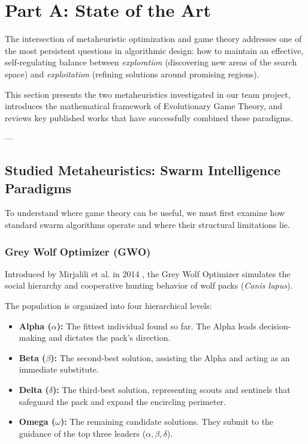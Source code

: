 \section{Part A: State of the Art}

The intersection of metaheuristic optimization and game theory addresses one of the most persistent questions in algorithmic design: how to maintain an effective, self-regulating balance between \textit{exploration} (discovering new areas of the search space) and \textit{exploitation} (refining solutions around promising regions). 

This section presents the two metaheuristics investigated in our team project, introduces the mathematical framework of Evolutionary Game Theory, and reviews key published works that have successfully combined these paradigms.

---

\subsection{Studied Metaheuristics: Swarm Intelligence Paradigms}

To understand where game theory can be useful, we must first examine how standard swarm algorithms operate and where their structural limitations lie.

\subsubsection{Grey Wolf Optimizer (GWO)}
Introduced by Mirjalili et al. in 2014 \cite{mirjalili2014grey}, the Grey Wolf Optimizer simulates the social hierarchy and cooperative hunting behavior of wolf packs (\textit{Canis lupus}).

The population is organized into four hierarchical levels:
\begin{itemize}
    \item \textbf{Alpha ($\alpha$):} The fittest individual found so far. The Alpha leads decision-making and dictates the pack's direction.
    \item \textbf{Beta ($\beta$):} The second-best solution, assisting the Alpha and acting as an immediate substitute.
    \item \textbf{Delta ($\delta$):} The third-best solution, representing scouts and sentinels that safeguard the pack and expand the encircling perimeter.
    \item \textbf{Omega ($\omega$):} The remaining candidate solutions. They submit to the guidance of the top three leaders ($\alpha, \beta, \delta$).
\end{itemize}

